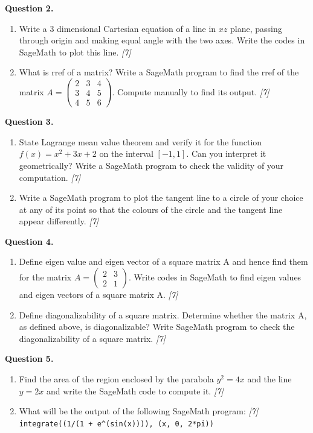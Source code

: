 \documentclass[11pt,a4paper]{article}
\newcommand{\pts}[1]{\hfill \textit{[#1]}}
\begin{document}
\bigskip

\noindent \textbf{Question 2.}
\begin{enumerate}[label=(\alph*)]
  \item Write a 3 dimensional Cartesian equation of a line in $xz$ plane, passing through origin and making equal angle with the two axes. Write the codes in SageMath to plot this line. \pts{7}
  \item What is rref of a matrix? Write a SageMath program to find the rref of the matrix $A = \begin{pmatrix} 2 & 3 & 4 \\ 3 & 4 & 5 \\ 4 & 5 & 6 \end{pmatrix}$. Compute manually to find its output. \pts{7}
\end{enumerate}

\bigskip

\noindent \textbf{Question 3.}
\begin{enumerate}[label=(\alph*)]
  \item State Lagrange mean value theorem and verify it for the function $f(x) = x^2 + 3x + 2$ on the interval $[-1, 1]$. Can you interpret it geometrically? Write a SageMath program to check the validity of your computation. \pts{7}
  \item Write a SageMath program to plot the tangent line to a circle of your choice at any of its point so that the colours of the circle and the tangent line appear differently. \pts{7}
\end{enumerate}

\bigskip

\noindent \textbf{Question 4.}
\begin{enumerate}[label=(\alph*)]
  \item Define eigen value and eigen vector of a square matrix A and hence find them for the matrix $A = \begin{pmatrix} 2 & 3 \\ 2 & 1 \end{pmatrix}$. Write codes in SageMath to find eigen values and eigen vectors of a square matrix A. \pts{7}
  \item Define diagonalizability of a square matrix. Determine whether the matrix A, as defined above, is diagonalizable? Write SageMath program to check the diagonalizability of a square matrix. \pts{7}
\end{enumerate}

\bigskip

\noindent \textbf{Question 5.}
\begin{enumerate}[label=(\alph*)]
  \item Find the area of the region enclosed by the parabola $y^2 = 4x$ and the line $y = 2x$ and write the SageMath code to compute it. \pts{7}
  \item What will be the output of the following SageMath program: \pts{7}\\
  \texttt{integrate((1/(1 + e\textasciicircum(sin(x)))), (x, 0, 2*pi))}
\end{enumerate}
\end{document}

